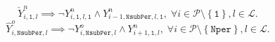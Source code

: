 \documentclass{amsart}
\begin{document}
\begin{equation}
    \check{Y}^n_{i,\mathtt{1},l} \implies 
    \neg Y^n_{i,\mathtt{1},l,\mathtt{1}} \wedge 
    Y^n_{i-1,\mathtt{NsubPer},l,\mathtt{1}}, \;
    \forall 
    i \in \mathcal{P} \setminus \left\{\mathtt{1}\right\},
    l \in \mathcal{L}.
\end{equation}
%
%
\begin{equation}
    \hat{Y}^o_{i,\mathtt{NsubPer},l} \implies 
    \neg Y^o_{i,\mathtt{NsubPer},l} \wedge 
    Y^n_{i+1,\mathtt{1},l}, \;
    \forall 
    i \in \mathcal{P} \setminus \left\{\mathtt{Nper}\right\},
    l \in \mathcal{L}.
\end{equation}
\end{document}
